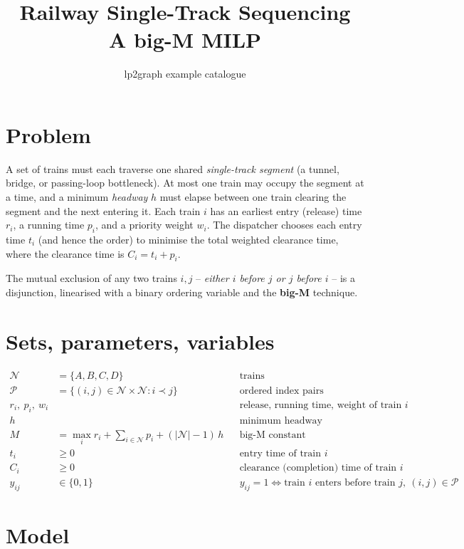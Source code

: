\documentclass[11pt]{article}
\title{Railway Single-Track Sequencing\\[2pt]\large A big-M MILP}
\author{lp2graph example catalogue}
\date{}
\begin{document}
\maketitle

\section*{Problem}

A set of trains must each traverse one shared \emph{single-track segment}
(a tunnel, bridge, or passing-loop bottleneck). At most one train may
occupy the segment at a time, and a minimum \emph{headway} $h$ must elapse
between one train clearing the segment and the next entering it. Each train
$i$ has an earliest entry (release) time $r_i$, a running time $p_i$, and a
priority weight $w_i$. The dispatcher chooses each entry time $t_i$ (and
hence the order) to minimise the total weighted clearance time, where the
clearance time is $C_i = t_i + p_i$.

The mutual exclusion of any two trains $i,j$ -- \emph{either $i$ before $j$
or $j$ before $i$} -- is a disjunction, linearised with a binary ordering
variable and the \textbf{big-M} technique.

\section*{Sets, parameters, variables}

\begin{align*}
\mathcal{N} &= \{A,B,C,D\} && \text{trains}\\
\mathcal{P} &= \{(i,j)\in\mathcal{N}\times\mathcal{N} : i \prec j\} && \text{ordered index pairs}\\[4pt]
r_i,\ p_i,\ w_i && & \text{release, running time, weight of train }i\\
h && & \text{minimum headway}\\
M &= \max_{i} r_i + \textstyle\sum_{i\in\mathcal{N}} p_i + (|\mathcal{N}|-1)\,h && \text{big-M constant}\\[4pt]
t_i &\ge 0 && \text{entry time of train }i\\
C_i &\ge 0 && \text{clearance (completion) time of train }i\\
y_{ij} &\in\{0,1\} && y_{ij}=1 \iff \text{train }i\text{ enters before train }j,\ (i,j)\in\mathcal{P}
\end{align*}

\section*{Model}
\end{document}

